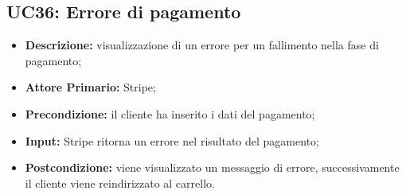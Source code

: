 \subsection{UC36: Errore di pagamento}
\label{sec:UC36}
\begin{itemize}
    \item \textbf{Descrizione:} visualizzazione di un errore per un fallimento nella fase di pagamento;
    \item \textbf{Attore Primario:} Stripe;
    \item \textbf{Precondizione:} il cliente ha inserito i dati del pagamento;
    \item \textbf{Input:} Stripe ritorna un errore nel risultato del pagamento;
    \item \textbf{Postcondizione:} viene visualizzato un messaggio di errore, successivamente il cliente viene reindirizzato al carrello.
\end{itemize}